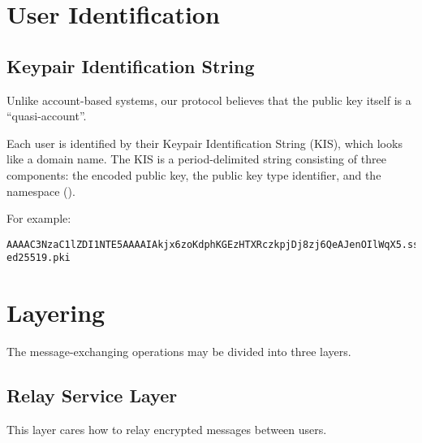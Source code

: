 \section{User Identification}

\subsection{Keypair Identification String}

Unlike account-based systems, our protocol believes that the public key itself is a ``quasi-account''.

Each user is identified by their Keypair Identification String (KIS), which looks like a domain name.
The KIS is a period-delimited string consisting of three components: the encoded public key,
the public key type identifier, and the namespace ().

For example:

\begin{lstlisting}
AAAAC3NzaC1lZDI1NTE5AAAAIAkjx6zoKdphKGEzHTXRczkpjDj8zj6QeAJenOIlWqX5.ssh-ed25519.pki
\end{lstlisting}












\section{Layering}

The message-exchanging operations may be divided into three layers.


\subsection{Relay Service Layer}

This layer cares how to relay encrypted messages between users.

